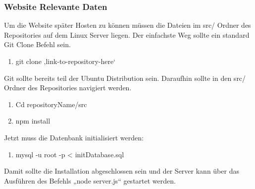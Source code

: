 \subsubsection{Website Relevante Daten}
Um die Website später Hosten zu können müssen die Dateien im src/ Ordner des Repositories auf dem Linux Server liegen. Der einfachste Weg sollte ein standard Git Clone Befehl sein.
\begin{enumerate}
	\item git clone ‚link-to-repository-here‘
\end{enumerate}
Git sollte bereits teil der Ubuntu Distribution sein. \newline
Daraufhin sollte in den src/ Ordner des Repositories navigiert werden.
\begin{enumerate}[resume]
	\item Cd repositoryName/src
	\item npm install
\end{enumerate}
Jetzt muss die Datenbank initialisiert werden:
\begin{enumerate}[resume]
	\item mysql -u root -p < initDatabase.sql
\end{enumerate}
Damit sollte die Installation abgeschlossen sein und der Server kann über das Ausführen des Befehls „node server.js“ gestartet werden.